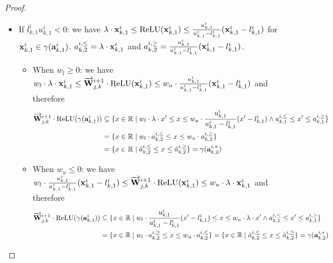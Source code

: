 \begin{proof}
\begin{itemize}
        \item If $l^i_{k,1} u^i_{k,1}<0$: we have $\lambda \cdot {\mathbf{x}}^i_{k,1}\le \text{ReLU}({\mathbf{x}}^i_{k,1})\le \frac{u^i_{k,1}}{u^i_{k,1}-l^i_{k,1}}({\mathbf{x}}^i_{k,1}-l^i_{k,1})$ for ${\mathbf{x}}^i_{k,1}\in\gamma({\mathbf{a}}^i_{k,1})$.   
        $a^{i,\le}_{k,2}=\lambda\cdot {\mathbf{x}}^{i}_{k,1}$ and $a^{i,\ge}_{k,2}=\frac{u^i_{k,1}}{u^i_{k,1}-l^i_{k,1}}({\mathbf{x}}^i_{k,1}-l^i_{k,1})$.
        \begin{itemize}
            \item When $w_l \ge 0$: we have $w_l \cdot \lambda \cdot {\mathbf{x}}^i_{k,1}\le \overrightarrow{{\mathbf{W}}}^{i+1}_{j,k}\cdot \text{ReLU}({\mathbf{x}}^i_{k,1})\le w_u\cdot \frac{u^i_{k,1}}{u^i_{k,1}-l^i_{k,1}}({\mathbf{x}}^i_{k,1}-l^i_{k,1})$ and therefore
            \begin{displaymath}
            \begin{aligned}
                \overrightarrow{{\mathbf{W}}}^{i+1}_{j,k}\cdot \text{ReLU}(\gamma({\mathbf{a}}^i_{k,1})) & \subseteq \{ x\in\mathbb{R} \mid w_l \cdot \lambda \cdot x' \le x \le w_u \cdot \frac{u^i_{k,1}}{u^i_{k,1}-l^i_{k,1}}(x'-l^i_{k,1})  \wedge a^{i,\le}_{k,1} \le x'\le a^{i,\ge}_{k,1}\} \\
                & = \{ x\in\mathbb{R} \mid w_l \cdot a^{i,\le}_{k,2} \le x \le w_u\cdot a^{i,\ge}_{k,2}\} \\
                & = \{x\in\mathbb{R} \mid \tilde{a}^{i,\le}_{k,2} \le x \le \tilde{a}^{i,\ge}_{k,2}\} = \gamma({\mathbf{a}}^{i,*}_{k,2})
            \end{aligned}
            \end{displaymath}

            \item When $w_u \le 0$: we have $w_l \cdot \frac{u^i_{k,1}}{u^i_{k,1}-l^i_{k,1}}({\mathbf{x}}^i_{k,1}-l^i_{k,1}) \le \overrightarrow{{\mathbf{W}}}^{i+1}_{j,k}\cdot \text{ReLU}({\mathbf{x}}^i_{k,1})\le w_u \cdot \lambda \cdot {\mathbf{x}}^i_{k,1}$ and therefore
            \begin{displaymath}
            \begin{aligned}
                \overrightarrow{{\mathbf{W}}}^{i+1}_{j,k}\cdot \text{ReLU}(\gamma({\mathbf{a}}^i_{k,1})) & \subseteq \{ x\in\mathbb{R} \mid w_l \cdot \frac{u^i_{k,1}}{u^i_{k,1}-l^i_{k,1}}(x'-l^i_{k,1}) \le x \le  w_u \cdot \lambda \cdot x' \wedge a^{i,\le}_{k,1} \le x'\le a^{i,\ge}_{k,1}\} \\
                & = \{ x\in\mathbb{R} \mid w_l \cdot a^{i,\ge}_{k,2} \le x \le w_u\cdot a^{i,\le}_{k,2}\} = \{x\in\mathbb{R} \mid \tilde{a}^{i,\le}_{k,2} \le x \le \tilde{a}^{i,\ge}_{k,2}\} = \gamma({\mathbf{a}}^{i,*}_{k,2})
            \end{aligned}
            \end{displaymath}


\end{itemize}
\end{itemize}
\end{proof}
